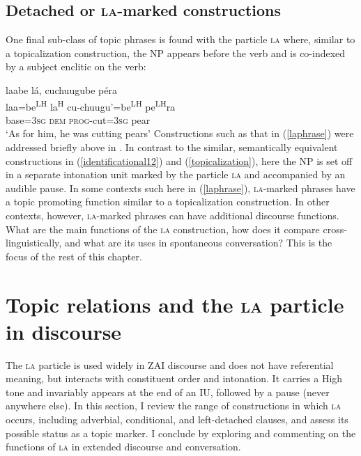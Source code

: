 \subsection{Detached or \textsc{la}-marked constructions}

One final sub-class of topic phrases is found with the particle \textsc{la} where, similar to a topicalization construction, the NP appears before the verb and is co-indexed by a subject enclitic on the verb:

\ea\label{laphrase} 
\glll laabe l\'{a}, cuchuugube p\'{e}ra  \\
laa=be\textsuperscript{LH} la\textsuperscript{H} cu-chuugu'=be\textsuperscript{LH} pe\textsuperscript{LH}ra  \\
base=\textsc{3sg} \textsc{dem} \textsc{prog}-cut=\textsc{3sg} pear  \\
\glt `As for him, he was cutting pears' 
\z
Constructions such as that in (\ref{laphrase}) were addressed briefly above in . In contrast to the similar, semantically equivalent constructions in (\ref{identificational12}) and (\ref{topicalization}), here the NP is set off in a separate intonation unit marked by the particle \textsc{la} and accompanied by an audible pause. In some contexts such here in (\ref{laphrase}), \textsc{la}-marked phrases have a topic promoting function similar to a topicalization construction. In other contexts, however, \textsc{la}-marked phrases can have additional discourse functions. What are the main functions of the \textsc{la} construction, how does it compare cross-linguistically, and what are its uses in spontaneous conversation? This is the focus of the rest of this chapter.



\section{Topic relations and the \textsc{la} particle in discourse}\label{laparticle}

The \textsc{la} particle is used widely in ZAI discourse and does not have referential meaning, but interacts with constituent order and intonation. It carries a High tone and invariably appears at the end of an IU, followed by a pause (never anywhere else). In this section, I review the range of constructions in which \textsc{la} occurs, including adverbial, conditional, and left-detached clauses, and assess its possible status as a topic marker. I conclude by exploring and commenting on the functions of \textsc{la} in extended discourse and conversation. 

